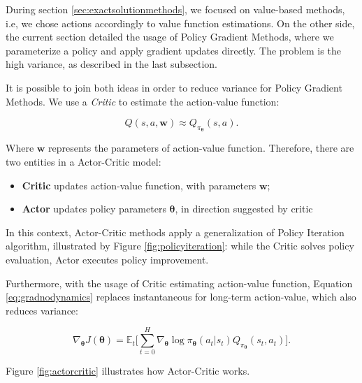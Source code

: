 During section \ref{sec:exactsolutionmethods}, we focused on value-based methods, i.e, we chose actions accordingly to value function estimations. On the other side, the current section detailed the usage of Policy Gradient Methods, where we parameterize a policy and apply gradient updates directly. The problem is the high variance, as described in the last subsection.

It is possible to join both ideas in order to reduce variance for Policy Gradient Methods. We use a \textit{Critic} to estimate the action-value function:

\begin{equation}
Q(s, a, \boldsymbol{w}) \approx Q_{\pi_{\boldsymbol{\theta}}}(s,a). 
\end{equation}

Where $\boldsymbol{w}$ represents the parameters of action-value function. Therefore, there are two entities in a Actor-Critic model:

\begin{itemize}
	\item \textbf{Critic} updates action-value function, with parameters $\boldsymbol{w}$;
	\item \textbf{Actor} updates policy parameters $\boldsymbol{\theta}$, in direction suggested by critic
\end{itemize}

In this context, Actor-Critic methods apply a generalization of Policy Iteration algorithm, illustrated by Figure \ref{fig:policyiteration}: while the Critic solves policy evaluation, Actor executes policy improvement.

Furthermore, with the usage of Critic estimating action-value function, Equation \eqref{eq:gradnodynamics} replaces instantaneous for long-term action-value, which also reduces variance:

\begin{equation}
\nabla_{\boldsymbol{\theta}} J(\boldsymbol{\theta}) = \mathbb{E}_{t} \Bigg[ \sum_{t=0}^{H} \nabla_{\boldsymbol{\theta}} \log \pi_{\boldsymbol{\theta}} (a_{t}|s_{t}) Q_{\pi_{\boldsymbol{\theta}}}(s_{t},a_{t}) \Bigg].
\end{equation}


Figure \ref{fig:actorcritic} illustrates how Actor-Critic works.

